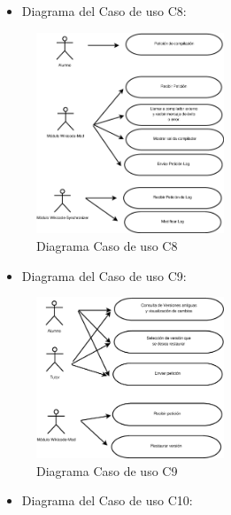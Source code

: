 \newpage

\begin{itemize}
	\item Diagrama del Caso de uso C8:
\end{itemize}

\begin{figure}[h]
	\centering
	\includegraphics[width=0.5\textwidth]{./img/c3-cu8.eps}
	\caption{Diagrama Caso de uso C8}
\end{figure}

\vspace{1.5cm}

\begin{itemize}
	\item Diagrama del Caso de uso C9:
\end{itemize}

\begin{figure}[h]
	\centering
	\includegraphics[width=0.5\textwidth]{./img/c3-cu9.eps}
	\caption{Diagrama Caso de uso C9}
\end{figure}

\newpage

\begin{itemize}
	\item Diagrama del Caso de uso C10:
\end{itemize}

